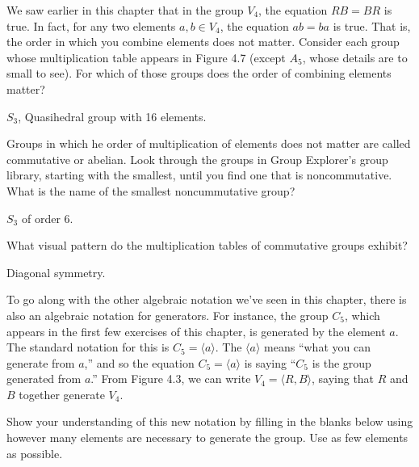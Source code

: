 \documentclass[11pt]{exam}
\begin{document}
\begin{questions}
	\question We saw earlier in this chapter that in the group $V_4$, the equation $RB=BR$ is true. In fact, for any two elements $a,b\in V_4$, the equation $ab=ba$ is true. That is, the order in which you combine elements does not matter. Consider each group whose multiplication table appears in Figure 4.7 (except $A_5$, whose details are to small to see). For which of those groups does the order of combining elements matter?
	\begin{solution}
		\par $S_3$, Quasihedral group with 16 elements.
	\end{solution}

	\question Groups in which he order of multiplication of elements does not matter are called commutative or abelian. Look through the groups in Group Explorer's group library, starting with the smallest, until you find one that is noncommutative. What is the name of the smallest noncummutative group?
	\begin{solution}
		$S_3$ of order 6.
	\end{solution}

	\question What visual pattern do the multiplication tables of commutative groups exhibit?
 	\begin{solution}
		\par Diagonal symmetry.
	\end{solution}

	\question To go along with the other algebraic notation we've seen in this chapter, there is also an algebraic notation for generators. For instance, the group $C_5$, which appears in the first few exercises of this chapter, is generated by the element $a$. The standard notation for this is $C_5 = \langle a\rangle$. The $\langle a\rangle$ means ``what you can generate from $a$,'' and so the equation $C_5=\langle a\rangle$ is saying ``$C_5$ is the group generated from $a$.'' From Figure 4.3, we can write $V_4 = \langle R,B\rangle$, saying that $R$ and $B$ together generate $V_4$.
	\par Show your understanding of this new notation by filling in the blanks below using however many elements are necessary to generate the group. Use as few elements as possible.
\end{questions}
\end{document}
